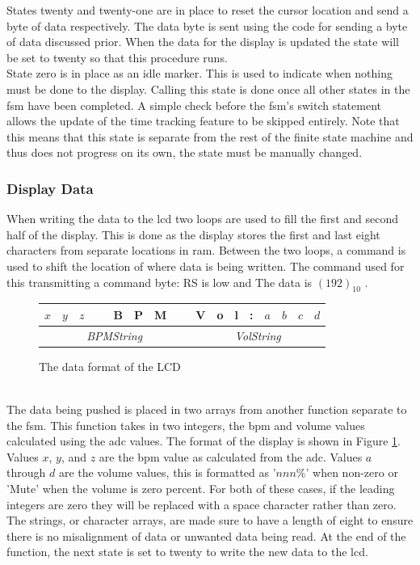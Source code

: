 \documentclass[12pt,a4paper]{report}
\begin{document}
States twenty and twenty-one are in place to reset the cursor location and send a byte of data respectively. The data byte is sent using the code for sending a byte of data discussed prior. When the data for the display is updated the state will be set to twenty so that this procedure runs.\\
State zero is in place as an idle marker. This is used to indicate when nothing must be done to the display. Calling this state is done once all other states in the \ac{fsm} have been completed. A simple check before the \ac{fsm}'s switch statement allows the update of the time tracking feature to be skipped entirely. Note that this means that this state is separate from the rest of the finite state machine and thus does not progress on its own, the state must be manually changed.
\subsubsection{Display Data}
When writing the data to the \ac{lcd} two loops are used to fill the first and second half of the display. This is done as the display stores the first and last eight characters from separate locations in \ac{ram}. Between the two loops, a command is used to shift the location of where data is being written. The command used for this transmitting a command byte: RS is low and The data is $(192)_{10}$ \cite{lcd}.
\begin{figure}[h!]
	\centering
	\begin{tabular}{|c|c|c|c|c|c|c|c||c|c|c|c|c|c|c|c|}
		\hline
		$x$ & $y$ & $z$ & \  &B & P & M & \  & V & o & l & : & $a$ & $b$ & $c$ & $d$ \\
		\hline
		\multicolumn{8}{|c||}{\textit{BPMString}} & \multicolumn{8}{c|}{\textit{VolString}}\\
		\hline
	\end{tabular}
	\caption{The data format of the LCD}
	\label{fig:LCDDat}
\end{figure}\\
The data being pushed is placed in two arrays from another function separate to the \ac{fsm}. This function takes in two integers, the \ac{bpm} and volume values calculated using the \ac{adc} values. The format of the display is shown in Figure \ref{fig:LCDDat}. Values $x$, $y$, and $z$ are the \ac{bpm} value as calculated from the \ac{adc}. Values $a$ through $d$ are the volume values, this is formatted as '$nnn\%$' when non-zero or 'Mute' when the volume is zero percent. For both of these cases, if the leading integers are zero they will be replaced with a space character rather than zero. The strings, or character arrays, are made sure to have a length of eight to ensure there is no misalignment of data or unwanted data being read. At the end of the function, the next state is set to twenty to write the new data to the \ac{lcd}.
\end{document}
